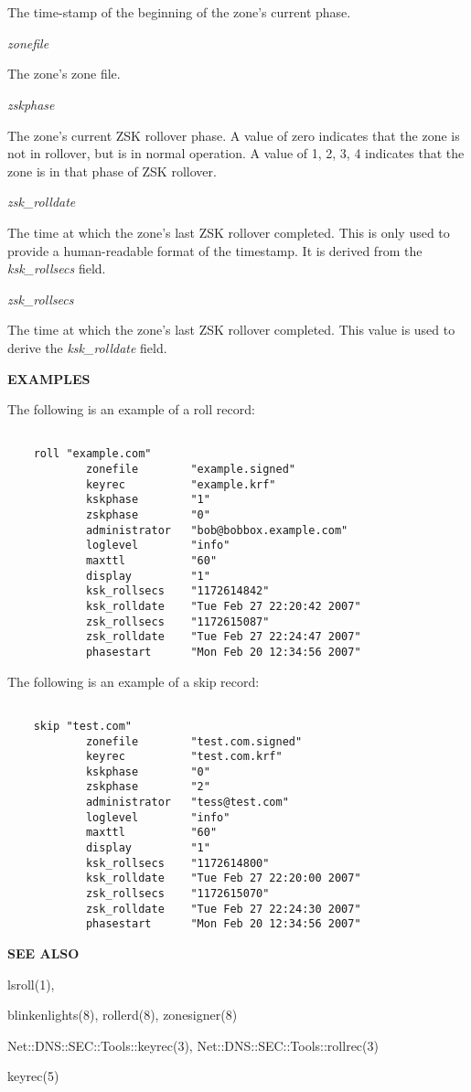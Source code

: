 \begin{description}
The time-stamp of the beginning of the zone's current phase.

\item {\it zonefile}\verb" "

The zone's zone file.

\item {\it zskphase}\verb" "

The zone's current ZSK rollover phase.  A value of zero indicates that the zone
is not in rollover, but is in normal operation.  A value of 1, 2, 3, 4
indicates that the zone is in that phase of ZSK rollover.

\item {\it zsk\_rolldate}\verb" "

The time at which the zone's last ZSK rollover completed.  This is only used
to provide a human-readable format of the timestamp.  It is derived from the
{\it ksk\_rollsecs} field.

\item {\it zsk\_rollsecs}\verb" "

The time at which the zone's last ZSK rollover completed.  This value is used
to derive the {\it ksk\_rolldate} field.

\end{description}

{\bf EXAMPLES}

The following is an example of a roll  record:

\begin{verbatim}

    roll "example.com"
            zonefile        "example.signed"
            keyrec          "example.krf"
            kskphase        "1"
            zskphase        "0"
            administrator   "bob@bobbox.example.com"
            loglevel        "info"
            maxttl          "60"
            display         "1"
            ksk_rollsecs    "1172614842"
            ksk_rolldate    "Tue Feb 27 22:20:42 2007"
            zsk_rollsecs    "1172615087"
            zsk_rolldate    "Tue Feb 27 22:24:47 2007"
            phasestart      "Mon Feb 20 12:34:56 2007"

\end{verbatim}

The following is an example of a skip  record:

\begin{verbatim}

    skip "test.com"
            zonefile        "test.com.signed"
            keyrec          "test.com.krf"
            kskphase        "0"
            zskphase        "2"
            administrator   "tess@test.com"
            loglevel        "info"
            maxttl          "60"
            display         "1"
            ksk_rollsecs    "1172614800"
            ksk_rolldate    "Tue Feb 27 22:20:00 2007"
            zsk_rollsecs    "1172615070"
            zsk_rolldate    "Tue Feb 27 22:24:30 2007"
            phasestart      "Mon Feb 20 12:34:56 2007"

\end{verbatim}

{\bf SEE ALSO}

lsroll(1),

blinkenlights(8),
rollerd(8),
zonesigner(8)

Net::DNS::SEC::Tools::keyrec(3),
Net::DNS::SEC::Tools::rollrec(3)

keyrec(5)

